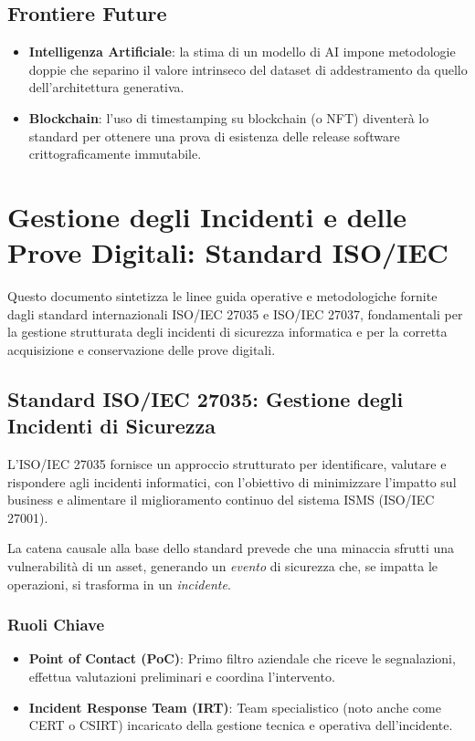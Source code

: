 \documentclass[11pt,a4paper]{article}
\begin{document}
\subsection{Frontiere Future}
\begin{itemize}
    \item \textbf{Intelligenza Artificiale}: la stima di un modello di AI impone metodologie doppie che separino il valore intrinseco del dataset di addestramento da quello dell'architettura generativa.
    \item \textbf{Blockchain}: l'uso di timestamping su blockchain (o NFT) diventerà lo standard per ottenere una prova di esistenza delle release software crittograficamente immutabile.
\end{itemize}


\section{Gestione degli Incidenti e delle Prove Digitali: Standard ISO/IEC}
Questo documento sintetizza le linee guida operative e metodologiche fornite dagli standard internazionali ISO/IEC 27035 e ISO/IEC 27037, fondamentali per la gestione strutturata degli incidenti di sicurezza informatica e per la corretta acquisizione e conservazione delle prove digitali.

\subsection{Standard ISO/IEC 27035: Gestione degli Incidenti di Sicurezza}
L'ISO/IEC 27035 fornisce un approccio strutturato per identificare, valutare e rispondere agli incidenti informatici, con l'obiettivo di minimizzare l'impatto sul business e alimentare il miglioramento continuo del sistema ISMS (ISO/IEC 27001). 

La catena causale alla base dello standard prevede che una minaccia sfrutti una vulnerabilità di un asset, generando un \textit{evento} di sicurezza che, se impatta le operazioni, si trasforma in un \textit{incidente}.

\subsubsection{Ruoli Chiave}
\begin{itemize}
    \item \textbf{Point of Contact (PoC)}: Primo filtro aziendale che riceve le segnalazioni, effettua valutazioni preliminari e coordina l'intervento.
    \item \textbf{Incident Response Team (IRT)}: Team specialistico (noto anche come CERT o CSIRT) incaricato della gestione tecnica e operativa dell'incidente.
\end{itemize}
\end{document}
